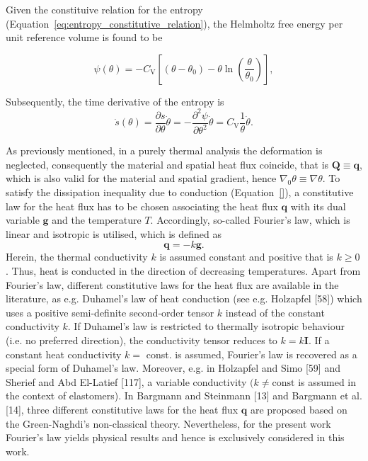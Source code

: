 Given the constituive relation for the entropy (Equation~\eqref{eq:entropy_constitutive_relation}), the Helmholtz free energy per unit reference volume is found to be
\begin{highlight}
\begin{equation}
\psi(\theta)=- C_{\mathrm{V}}\left[\left(\theta-\theta_{0}\right)-\theta \ln \left(\frac{\theta}{\theta_{0}}\right)\right],
\end{equation}
\end{highlight}
Subsequently, the time derivative of the entropy is
\begin{equation}
\dot{s}(\theta)=\frac{\partial s}{\partial \theta} \dot{\theta}=-\frac{\partial^{2} \psi}{\partial \theta^{2}} \dot{\theta}=C_{\mathrm{V}} \frac{1}{\theta} \dot{\theta}.
\end{equation}

As previously mentioned, in a purely thermal analysis the deformation is neglected, consequently the material and spatial heat flux coincide, that is \(\bm Q \equiv \bm q\), which is also valid for the material and spatial gradient, hence \(\nabla_0 \theta \equiv \nabla \theta\).
To satisfy the dissipation inequality due to conduction (Equation~\eqref{}), a constitutive law for the heat flux has to be chosen associating the heat flux \(\bm q\) with its dual variable \(\bm g\) and the temperature \(T\).
Accordingly, so-called Fourier's law, which is linear and isotropic is utilised, which is defined as
\[
\bm q=-k \bm g.
\]
Herein, the thermal conductivity \(k\) is assumed constant and positive that is \(k \geq 0\).
Thus, heat is conducted in the direction of decreasing temperatures.
Apart from Fourier's law, different constitutive laws for the heat flux are available in the literature, as e.g. Duhamel's law of heat conduction (see e.g. Holzapfel [58]) which uses a positive semi-definite second-order tensor \(k\) instead of the constant conductivity \(k\).
If Duhamel's law is restricted to thermally isotropic behaviour (i.e. no preferred direction), the conductivity tensor reduces to \(k=k \boldsymbol{I}\).
If a constant heat conductivity \(k=\) const. is assumed, Fourier's law is recovered as a special form of Duhamel's law. Moreover, e.g. in Holzapfel and Simo [59] and Sherief and Abd El-Latief [117], a variable conductivity \((k \neq \mathrm{const}\) is assumed in the context of elastomers).
In Bargmann and Steinmann [13] and Bargmann et al. [14], three different constitutive laws for the heat flux \(\bm q\) are proposed based on the Green-Naghdi's non-classical theory.
Nevertheless, for the present work Fourier's law yields physical results and hence is exclusively considered in this work.

